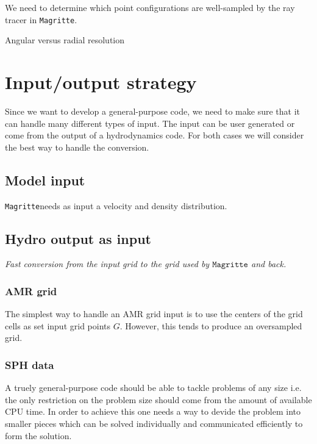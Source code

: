 \documentclass[]{article}
\newcommand{\Magritte}{\texttt{Magritte}}
\begin{document}
\bigskip

We need to determine which point configurations are well-sampled by the ray tracer in \Magritte.

Angular versus radial resolution



\section{Input/output strategy}

Since we want to develop a general-purpose code, we need to make sure that it can handle many different types of input. The input can be user generated or come from the output of a hydrodynamics code. For both cases we will consider the best way to handle the conversion.


\subsection{Model input}

\Magritte needs as input a velocity and density distribution.


\subsection{Hydro output as input}
\bigskip

\emph{Fast conversion from the input grid to the grid used by $\Magritte$ and back.}

\subsubsection{AMR grid}

The simplest way to handle an AMR grid input is to use the centers of the grid cells as set input grid points $G$. However, this tends to produce an oversampled grid.



\subsubsection{SPH data}

A truely general-purpose code should be able to tackle problems of any size i.e. the only restriction on the problem size should come from the amount of available CPU time.  In order to achieve this one needs a way to devide the problem into smaller pieces which can be solved individually and communicated efficiently to form the solution.
\end{document}
